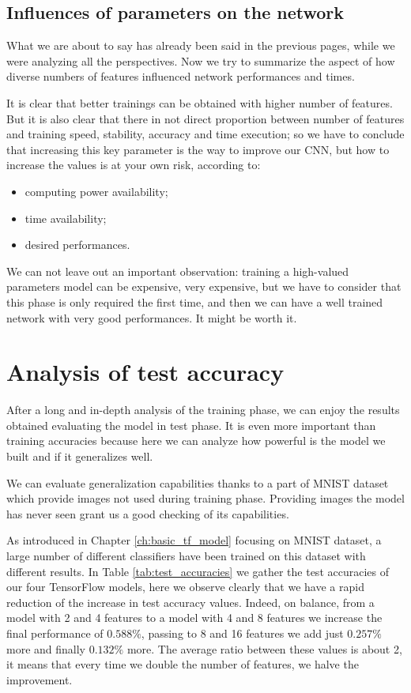 \subsection{Influences of parameters on the network}

What we are about to say has already been said in the previous pages, while we were analyzing all the perspectives. Now we try to summarize the aspect of how diverse numbers of features influenced network performances and times.

It is clear that better trainings can be obtained with higher number of features. But it is also clear that there in not direct proportion between number of features and training speed, stability, accuracy and time execution; so we have to conclude that increasing this key parameter is the way to improve our \acs{CNN}, but how to increase the values is at your own risk, according to:
\begin{itemize}
	\item computing power availability;
	\item time availability;
	\item desired performances.
\end{itemize}

We can not leave out an important observation: training a high-valued parameters model can be expensive, very expensive, but we have to consider that this phase is only required the first time, and then we can have a well trained network with very good performances. It might be worth it.

\section{Analysis of test accuracy}

After a long and in-depth analysis of the training phase, we can enjoy the results obtained evaluating the model in test phase. It is even more important than training accuracies because here we can analyze how powerful is the model we built and if it generalizes well.

We can evaluate generalization capabilities thanks to a part of \acs{MNIST} dataset which provide images not used during training phase. Providing images the model has never seen grant us a good checking of its capabilities.

As introduced in Chapter \ref{ch:basic_tf_model} focusing on \acs{MNIST} dataset, a large number of different classifiers have been trained on this dataset with different results. In Table \ref{tab:test_accuracies} we gather the test accuracies of our four TensorFlow models, here we observe clearly that we have a rapid reduction of the increase in test accuracy values. Indeed, on balance, from a model with 2 and 4 features to a model with 4 and 8 features we increase the final performance of $0.588 \%$, passing to 8 and 16 features we add just $0.257 \%$ more and finally $0.132 \%$ more. The average ratio between these values is about 2, it means that every time we double the number of features, we halve the improvement.

